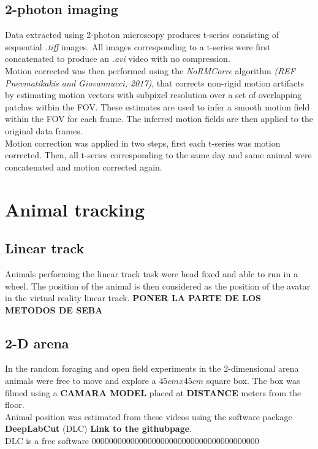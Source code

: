 \subsection{2-photon imaging}
\label{chap3:sec:2:subsec1:2p-pre-proc}
Data extracted using 2-photon microscopy produces t-series consisting of sequential \textit{.tiff} images. 
All images corresponding to a t-series were first concatenated to produce an \textit{.avi} video with no compression. \\
Motion corrected was then performed using the \textit{NoRMCorre} algorithm \textit{(REF Pnevmatikakis and Giovannucci, 2017)}, that corrects non-rigid motion artifacts by estimating motion vectors with subpixel resolution over a set of overlapping patches within the FOV. 
These estimates are used to infer a smooth motion field within the FOV for each frame. 
The inferred motion fields are then applied to the original data frames.\\
Motion correction was applied in two steps, first each t-series was motion corrected.
Then, all t-series corresponding to the same day and same animal were concatenated and motion corrected again. 

\section{Animal tracking}
\label{chap3:sec:3:tracking}
\subsection{Linear track}
\label{chap3:sec:3:subsec1:linear-track-tracking}
Animals performing the linear track task were head fixed and able to run in a wheel.
The position of the animal is then considered as the position of the avatar in the virtual reality linear track. \textbf{PONER LA PARTE DE LOS METODOS DE SEBA}
\subsection{2-D arena}
\label{chap3:sec:3:subsec2:2d-arena-tracking}
In the random foraging and open field experiments in the 2-dimensional arena animals were free to move and explore a $45 cm x 45 cm$ square box. The box was filmed using a \textbf{CAMARA MODEL} placed at \textbf{DISTANCE} meters from the floor. \\
Animal position was estimated from these videos using the software package \textbf{DeepLabCut} (DLC) \textbf{Link to the githubpage}.\\
DLC is a free software 000000000000000000000000000000000000000


